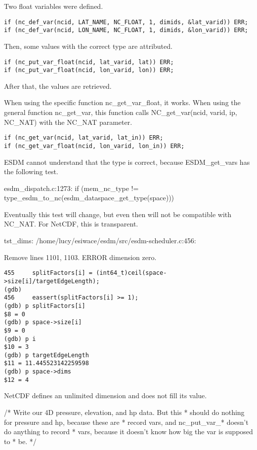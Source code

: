Two float variables were defined.

\begin{verbatim}
if (nc_def_var(ncid, LAT_NAME, NC_FLOAT, 1, dimids, &lat_varid)) ERR;
if (nc_def_var(ncid, LON_NAME, NC_FLOAT, 1, dimids, &lon_varid)) ERR;
\end{verbatim}

Then, some values with the correct type are attributed.

\begin{verbatim}
if (nc_put_var_float(ncid, lat_varid, lat)) ERR;
if (nc_put_var_float(ncid, lon_varid, lon)) ERR;
\end{verbatim}

After that, the values are retrieved.

When using the specific function nc\_get\_var\_float, it works. When using the general function nc\_get\_var, this function calls NC\_get\_var(ncid, varid, ip, NC\_NAT) with the NC\_NAT parameter.

\begin{verbatim}
if (nc_get_var(ncid, lat_varid, lat_in)) ERR;
if (nc_get_var_float(ncid, lon_varid, lon_in)) ERR;
\end{verbatim}

ESDM cannot understand that the type is correct, because ESDM\_get\_vars has the following test.

esdm\_dispatch.c:1273: if (mem\_nc\_type != type\_esdm\_to\_nc(esdm\_dataspace\_get\_type(space)))

Eventually this test will change, but even then will not be compatible with NC\_NAT. For NetCDF, this is transparent.

tst\_dims: /home/lucy/esiwace/esdm/src/esdm-scheduler.c:456:

Remove lines 1101, 1103. ERROR dimension zero.

\begin{verbatim}
455	    splitFactors[i] = (int64_t)ceil(space->size[i]/targetEdgeLength);
(gdb)
456	    eassert(splitFactors[i] >= 1);
(gdb) p splitFactors[i]
$8 = 0
(gdb) p space->size[i]
$9 = 0
(gdb) p i
$10 = 3
(gdb) p targetEdgeLength
$11 = 11.445523142259598
(gdb) p space->dims
$12 = 4
\end{verbatim}

NetCDF defines an unlimited dimension and does not fill its value.

/* Write our 4D pressure, elevation, and hp data. But this
 * should do nothing for pressure and hp, because these are
 * record vars, and nc\_put\_var\_* doesn't do anything to record
 * vars, because it doesn't know how big the var is supposed to
 * be. */

